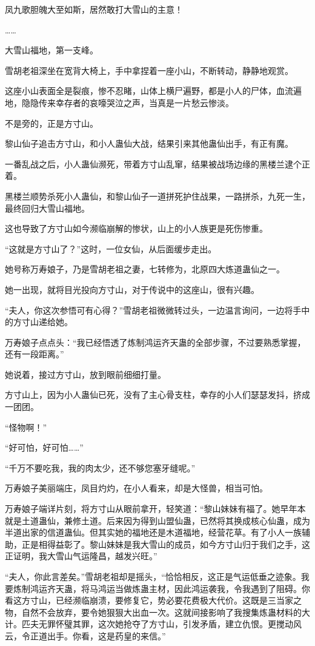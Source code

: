 \begin{this_body}
凤九歌胆魄大至如斯，居然敢打大雪山的主意！

……

大雪山福地，第一支峰。

雪胡老祖深坐在宽背大椅上，手中拿捏着一座小山，不断转动，静静地观赏。

这座小山表面全是裂痕，惨不忍睹，山体上横尸遍野，都是小人的尸体，血流遍地，隐隐传来幸存者的哀嚎哭泣之声，当真是一片愁云惨淡。

不是旁的，正是方寸山。

黎山仙子追击方寸山，和小人蛊仙大战，结果引来其他蛊仙出手，有正有魔。

一番乱战之后，小人蛊仙濒死，带着方寸山乱窜，结果被战场边缘的黑楼兰逮个正着。

黑楼兰顺势杀死小人蛊仙，和黎山仙子一道拼死护住战果，一路拼杀，九死一生，最终回归大雪山福地。

这也导致了方寸山如今濒临崩解的惨状，山上的小人族更是死伤惨重。

“这就是方寸山了？”这时，一位女仙，从后面缓步走出。

她号称万寿娘子，乃是雪胡老祖之妻，七转修为，北原四大炼道蛊仙之一。

她一出现，就将目光投向方寸山，对于传说中的这座山，很有兴趣。

“夫人，你这次参悟可有心得？”雪胡老祖微微转过头，一边温言询问，一边将手中的方寸山递给她。

万寿娘子点点头：“我已经悟透了炼制鸿运齐天蛊的全部步骤，不过要熟悉掌握，还有一段距离。”

她说着，接过方寸山，放到眼前细细打量。

方寸山上，因为小人蛊仙已死，没有了主心骨支柱，幸存的小人们瑟瑟发抖，挤成一团团。

“怪物啊！”

“好可怕，好可怕……”

“千万不要吃我，我的肉太少，还不够您塞牙缝呢。”

万寿娘子美丽端庄，凤目灼灼，在小人看来，却是大怪兽，相当可怕。

万寿娘子端详片刻，将方寸山从眼前拿开，轻笑道：“黎山妹妹有福了。她早年本就是土道蛊仙，兼修土道。后来因为得到山盟仙蛊，已然将其换成核心仙蛊，成为半道出家的信道蛊仙。但其实她的福地还是木道福地，经营花草。有了小人一族辅助，正是相得益彰了。黎山妹妹是我大雪山的成员，如今方寸山归于我们之手，这正证明，我大雪山气运隆昌，越发兴旺。”

“夫人，你此言差矣。”雪胡老祖却是摇头，“恰恰相反，这正是气运低垂之迹象。我要炼制鸿运齐天蛊，将马鸿运当做炼蛊主材，因此鸿运袭我，令我遇到了阻碍。你看这方寸山，已经濒临崩溃，要修复它，势必要花费极大代价。这既是三当家之物，自然不会放弃，要令她狠狠大出血一次。这就间接影响了我搜集炼蛊材料的大计。匹夫无罪怀璧其罪，这次她抢夺了方寸山，引发矛盾，建立仇恨。更搅动风云，令正道出手。你看，这是药皇的来信。”


\end{this_body}
